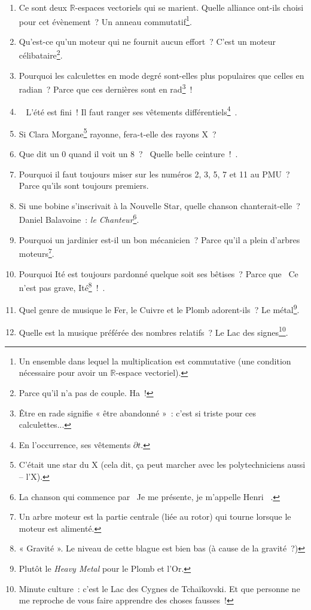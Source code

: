 \documentclass[10pt,a5paper,fullpage]{book}
\begin{document}
\begin{enumerate}
		\item Ce sont deux $\mathbb{R}$-espaces vectoriels qui se marient. Quelle alliance ont-ils choisi pour cet évènement~? Un anneau commutatif\footnote{Un ensemble dans lequel la multiplication est commutative (une condition nécessaire pour avoir un $\mathbb{R}$-espace vectoriel).}. 
		\item Qu’est-ce qu’un moteur qui ne fournit aucun effort~? C’est un moteur célibataire\footnote{Parce qu'il n'a pas de couple. Ha~!}.
		\item Pourquoi les calculettes en mode degré sont-elles plus populaires que celles en radian~? Parce que ces dernières sont en rad\footnote{Être en rade signifie « être abandonné »~: c’est si triste pour ces calculettes...}~!
		\item \guillemotleft~ L'été est fini~! Il faut ranger ses vêtements différentiels\footnote{En l'occurrence, ses vêtements $\partial t$.}~\guillemotright.
		\item Si Clara Morgane\footnote{C’était une star du X (cela dit, ça peut marcher avec les polytechniciens aussi -- l’X).} rayonne, fera-t-elle des rayons X~?
		\item Que dit un 0 quand il voit un 8~? \guillemotleft~Quelle belle ceinture~!~\guillemotright.
		\item Pourquoi il faut toujours miser sur les numéros 2, 3, 5, 7 et 11 au PMU~? Parce qu’ils sont toujours premiers.
		\item Si une bobine s'inscrivait à la Nouvelle Star, quelle chanson chanterait-elle~? Daniel Balavoine~: \textit{le Chanteur}\footnote{La chanson qui commence par \guillemotleft~Je me présente, je m'appelle Henri \textmusicalnote~\guillemotright.}.
		\item Pourquoi un jardinier est-il un bon mécanicien~? Parce qu’il a plein d’arbres moteurs\footnote{Un arbre moteur est la partie centrale (liée au rotor) qui tourne lorsque le moteur est alimenté.}.
		\item Pourquoi Ité est toujours pardonné quelque soit ses bêtises~? Parce que \guillemotleft~Ce n’est pas grave, Ité\footnote{« Gravité ». Le niveau de cette blague est bien bas (à cause de la gravité~?)}~!~\guillemotright.
		\item Quel genre de musique le Fer, le Cuivre et le Plomb adorent-ils~? Le métal\footnote{Plutôt le \textit{Heavy Metal} pour le Plomb et l’Or.}.
		\item Quelle est la musique préférée des nombres relatifs~? Le Lac des signes\footnote{Minute culture~: c’est le Lac des Cygnes de Tchaïkovski. Et que personne ne me reproche de vous faire apprendre des choses fausses~!}.

\end{enumerate}
\end{document}
